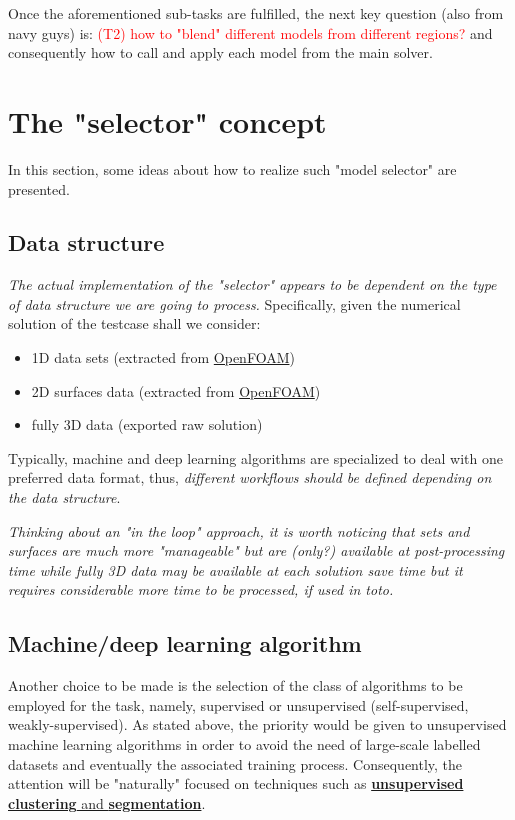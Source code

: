 \vspace{10pt}
\noindent Once the aforementioned sub-tasks are fulfilled, the next key question (also from navy guys) is: \textcolor{red}{(T2) how to "blend" different models from different regions?} and consequently how to call and apply each model from the main solver.

\section{The "selector" concept}
In this section, some ideas about how to realize such "model selector" are presented.

\subsection{Data structure}
\textit{The actual implementation of the "selector" appears to be dependent on the type of data structure we are going to process.} Specifically, given the numerical solution of the testcase shall we consider:
\begin{itemize}
    \item 1D data sets (extracted from \href{\#OpenFOAM.ind}{OpenFOAM})
    \item 2D surfaces data (extracted from \href{\#OpenFOAM.ind}{OpenFOAM})
    \item fully 3D data (exported raw solution)
\end{itemize}
Typically, machine and deep learning algorithms are specialized to deal with one preferred data format, thus, \textit{different workflows should be defined depending on the data structure}. 

\textit{Thinking about an "in the loop" approach, it is worth noticing that sets and surfaces are much more "manageable" but are (only?) available at post-processing time while fully 3D data may be available at each solution save time but it requires considerable more time to be processed, if used in toto.}

\subsection{Machine/deep learning algorithm}
Another choice to be made is the selection of the class of algorithms to be employed for the task, namely, supervised or unsupervised (self-supervised, weakly-supervised). 
As stated above, the priority would be given to unsupervised machine learning algorithms in order to avoid the need of large-scale labelled datasets and eventually the associated training process. Consequently, the attention will be "naturally" focused on techniques such as \underline{\textbf{unsupervised} \textbf{clustering} and \textbf{segmentation}}. 
 
